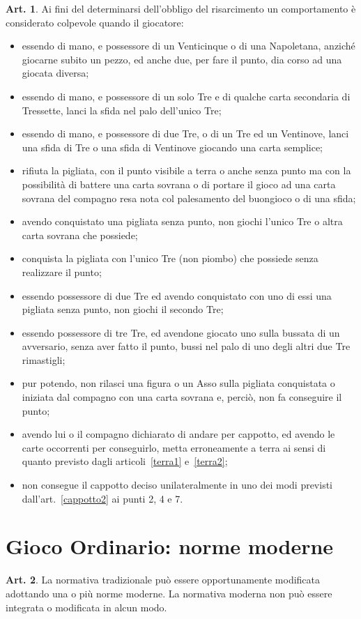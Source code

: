 \documentclass[italian,a4paper]{book}
\theoremstyle{definition}
\newtheorem{art}{Art.}
\newenvironment{packeditem}{
\begin{itemize}
  \setlength{\itemsep}{1pt}
  \setlength{\parskip}{0pt}
  \setlength{\parsep}{0pt}
}{\end{itemize}}
\begin{document}
\begin{art}
Ai fini del determinarsi dell'obbligo del risarcimento un comportamento è considerato colpevole quando il giocatore:
\begin{packeditem}
\item  essendo di mano, e possessore di un Venticinque o di una Napoletana, anziché giocarne subito un pezzo, ed anche due, per fare il punto, dia corso ad una giocata diversa;
\item  essendo di mano, e possessore di un solo Tre e di qualche carta secondaria di Tressette, lanci la sfida nel palo dell'unico Tre;
\item  essendo di mano, e possessore di due Tre, o di un Tre ed un Ventinove, lanci una sfida di Tre o una sfida di Ventinove giocando una carta semplice;
\item  rifiuta la pigliata, con il punto visibile a terra o anche senza punto ma con la possibilità di battere una carta sovrana o di portare il gioco ad una carta sovrana del compagno resa nota col palesamento del buongioco o di una sfida;
\item  avendo conquistato una pigliata senza punto, non giochi l'unico Tre o altra carta sovrana che possiede;
\item  conquista la pigliata con l'unico Tre (non piombo) che possiede senza realizzare il punto;
\item  essendo possessore di due Tre ed avendo conquistato con uno di essi una pigliata senza punto, non giochi il secondo Tre;
\item  essendo possessore di tre Tre, ed avendone giocato uno sulla bussata di un avversario, senza aver fatto il punto, bussi nel palo di uno degli altri due Tre rimastigli;
\item  pur potendo, non rilasci una figura o un Asso sulla pigliata conquistata o iniziata dal compagno con una carta sovrana e, perciò, non fa conseguire il punto;
\item              avendo lui o il compagno dichiarato di andare per cappotto, ed avendo le carte occorrenti per conseguirlo, metta erroneamente a terra ai sensi di quanto previsto dagli articoli~\ref{terra1} e~\ref{terra2};
\item             non consegue il cappotto deciso unilateralmente in uno dei
    modi previsti dall'art.~\ref{cappotto2} ai punti 2, 4 e 7.
    \end{packeditem}
\end{art}
\section{Gioco Ordinario: norme moderne}
\begin{art}
La normativa tradizionale può essere opportunamente modificata adottando una o più norme moderne.
La normativa moderna non può essere integrata o modificata in alcun modo.
\end{art}
\end{document}
